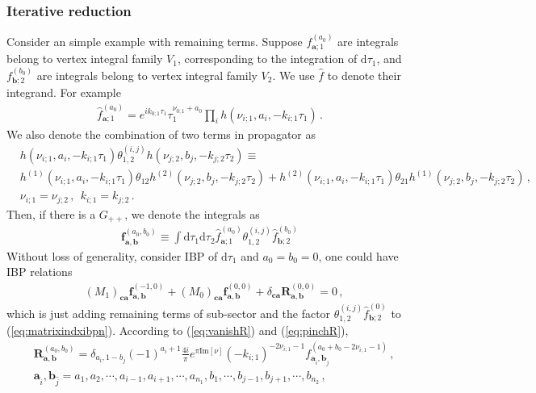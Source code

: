 \documentclass[a4paper,11pt]{article}
\newcommand{\nn}{\nonumber}
\newcommand{\nd}{\mathrm{d}}
\def\eqref#1{(\ref{#1})}
\begin{document}
\subsubsection{Iterative reduction}
Consider an simple example with remaining terms. Suppose $f^{(a_0)}_{\bm{a};1}$ are integrals belong to vertex integral family $V_1$, corresponding to the integration of $\nd \tau_1$, and  $f^{(b_0)}_{\bm{b};2}$ are integrals belong to vertex integral family $V_2$. We use $\hat{f}$ to denote their integrand. For example
\begin{align}
\hat{f}^{(a_0)}_{\bm{a};1} = e^{i k_{0;1}\tau_1} \tau_1^{\nu_{0;1}+a_0} \prod_i   h(\nu_{i;1},a_i,-k_{i;1}\tau_1) \,.
\end{align}
We also denote the combination of two terms in propagator as
\begin{align}
&h(\nu_{i;1},a_i,-k_{i;1}\tau_1) \theta_{1,2}^{(i,j)} h(\nu_{j;2},b_j,-k_{j;2}\tau_2)\equiv  \nn\\
&h^{(1)}(\nu_{i;1},a_i,-k_{i;1}\tau_1) \theta_{12} h^{(2)}(\nu_{j;2},b_j,-k_{j;2}\tau_2) + h^{(2)}(\nu_{i;1},a_i,-k_{i;1}\tau_1) \theta_{21} h^{(1)}(\nu_{j;2},b_j,-k_{j;2}\tau_2) \, , \nn\\
&\nu_{i;1}= \nu_{j;2} \,, \ \ k_{i;1}=k_{j;2} \, .
\end{align}
Then, if there is a $G_{++}$, we denote the integrals as
\begin{align}
\bm{f}^{(a_0,b_0)}_{\bm{a},\bm{b}} \equiv \int \nd \tau_1 \nd \tau_2  \hat{f}^{(a_0)}_{\bm{a};1} \theta_{1,2}^{(i,j)} \hat{f}^{(b_0)}_{\bm{b};2} \label{eq:egR}
\end{align}
Without loss of generality, consider IBP of $\nd \tau_1$ and $a_0=b_0=0$, one could have IBP relations
\begin{align}
 &\left(M_1\right)_{\bm{c}\bm{a}} \bm{f}^{(-1,0)}_{\bm{a},\bm{b}}+\left(M_0\right)_{\bm{c}\bm{a}} \bm{f}^{(0,0)}_{\bm{a},\bm{b}} + \delta_{\bm{c} \bm{a}} \bm{R}_{\bm{a},\bm{b}}^{(0,0)} =0 \, , 
\end{align}
which is just adding remaining terms of sub-sector and the factor $\theta_{1,2}^{(i,j)} \hat{f}^{(0)}_{\bm{b};2}$ to \eqref{eq:matrixindxibpn}. According to \eqref{eq:vanishR} and \eqref{eq:pinchR}, 
\begin{align}
&\bm{R}_{\bm{a},\bm{b}}^{(a_0,b_0)}=\delta_{a_i,1-b_j} (-1)^{a_i+1} \frac{4i}{\pi} e^{ \pi \text{Im}[\nu]} (-k_{i;1})^{-2\nu_{i;1}-1} f^{(a_0+b_0-2\nu_{i;1}-1)}_{\bm{a}_{\hat{i}},\bm{b}_{\hat{j}} } \,, \nn\\
&\bm{a}_{\hat{i}},\bm{b}_{\hat{j}} = a_1,a_2,\cdots,a_{i-1},a_{i+1},\cdots,a_{n_1},b_1,\cdots, b_{j-1},b_{j+1},\cdots, b_{n_2}  \, ,    \label{eq:Rterm}
\end{align}
\end{document}
